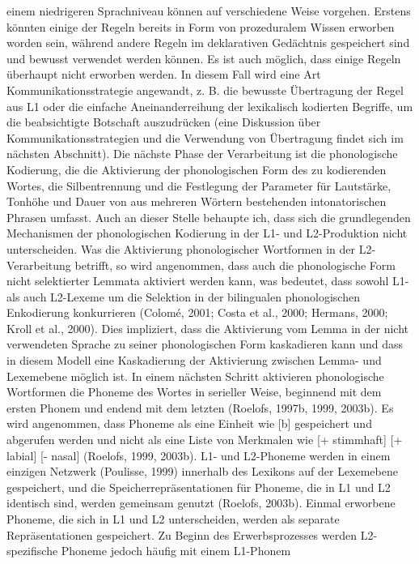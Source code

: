 \documentclass[
  letterpaper,
]{scrbook}
\begin{document}
einem niedrigeren Sprachniveau können auf verschiedene Weise vorgehen.
Erstens könnten einige der Regeln bereits in Form von prozeduralem
Wissen erworben worden sein, während andere Regeln im deklarativen
Gedächtnis gespeichert sind und bewusst verwendet werden können. Es ist
auch möglich, dass einige Regeln überhaupt nicht erworben werden. In
diesem Fall wird eine Art Kommunikationsstrategie angewandt, z. B. die
bewusste Übertragung der Regel aus L1 oder die einfache
Aneinanderreihung der lexikalisch kodierten Begriffe, um die
beabsichtigte Botschaft auszudrücken (eine Diskussion über
Kommunikationsstrategien und die Verwendung von Übertragung findet sich
im nächsten Abschnitt). Die nächste Phase der Verarbeitung ist die
phonologische Kodierung, die die Aktivierung der phonologischen Form des
zu kodierenden Wortes, die Silbentrennung und die Festlegung der
Parameter für Lautstärke, Tonhöhe und Dauer von aus mehreren Wörtern
bestehenden intonatorischen Phrasen umfasst. Auch an dieser Stelle
behaupte ich, dass sich die grundlegenden Mechanismen der phonologischen
Kodierung in der L1- und L2-Produktion nicht unterscheiden. Was die
Aktivierung phonologischer Wortformen in der L2-Verarbeitung betrifft,
so wird angenommen, dass auch die phonologische Form nicht selektierter
Lemmata aktiviert werden kann, was bedeutet, dass sowohl L1- als auch
L2-Lexeme um die Selektion in der bilingualen phonologischen Enkodierung
konkurrieren (Colomé, 2001; Costa et al., 2000; Hermans, 2000; Kroll et
al., 2000). Dies impliziert, dass die Aktivierung vom Lemma in der nicht
verwendeten Sprache zu seiner phonologischen Form kaskadieren kann und
dass in diesem Modell eine Kaskadierung der Aktivierung zwischen Lemma-
und Lexemebene möglich ist. In einem nächsten Schritt aktivieren
phonologische Wortformen die Phoneme des Wortes in serieller Weise,
beginnend mit dem ersten Phonem und endend mit dem letzten (Roelofs,
1997b, 1999, 2003b). Es wird angenommen, dass Phoneme als eine Einheit
wie {[}b{]} gespeichert und abgerufen werden und nicht als eine Liste
von Merkmalen wie {[}+ stimmhaft{]} {[}+ labial{]} {[}- nasal{]}
(Roelofs, 1999, 2003b). L1- und L2-Phoneme werden in einem einzigen
Netzwerk (Poulisse, 1999) innerhalb des Lexikons auf der Lexemebene
gespeichert, und die Speicherrepräsentationen für Phoneme, die in L1 und
L2 identisch sind, werden gemeinsam genutzt (Roelofs, 2003b). Einmal
erworbene Phoneme, die sich in L1 und L2 unterscheiden, werden als
separate Repräsentationen gespeichert. Zu Beginn des Erwerbsprozesses
werden L2-spezifische Phoneme jedoch häufig mit einem L1-Phonem
\end{document}
